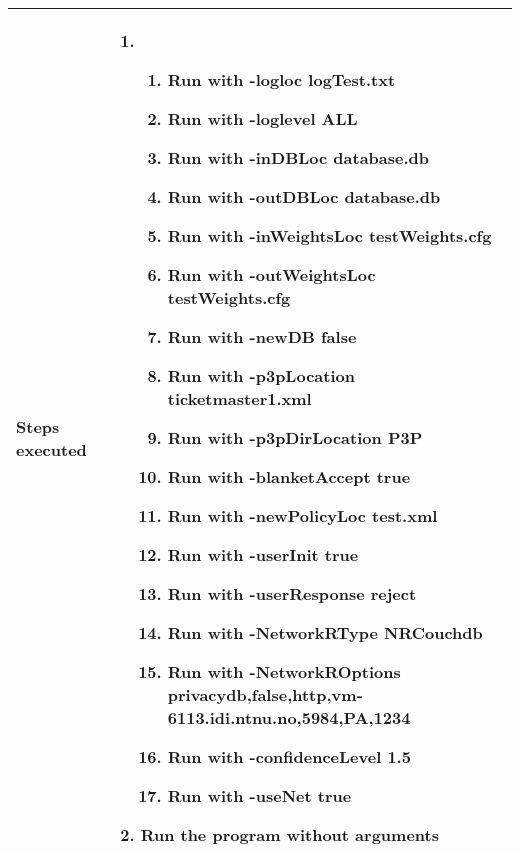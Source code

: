 \documentclass[a4paper]{article}
\begin{document}
\begin{center}
\begin{tabular}{ |  p{3cm} | p{7cm} | }
			Steps executed & 	\begin{enumerate}
							\item
							\begin{enumerate}
								\item Run with -logloc logTest.txt
								\item Run with -loglevel ALL
								\item Run with -inDBLoc database.db
								\item Run with -outDBLoc database.db
								\item Run with -inWeightsLoc testWeights.cfg
								\item Run with -outWeightsLoc testWeights.cfg
								\item Run with -newDB false
								\item Run with -p3pLocation ticketmaster1.xml
								\item Run with -p3pDirLocation P3P
								\item Run with -blanketAccept true
								\item Run with -newPolicyLoc test.xml
								\item Run with -userInit true
								\item Run with -userResponse reject
								\item Run with -NetworkRType NRCouchdb
								\item Run with -NetworkROptions privacydb,false,http,vm-6113.idi.ntnu.no,5984,PA,1234
								\item Run with -confidenceLevel 1.5
								\item Run with -useNet true
							\end{enumerate}
							\item Run the program without arguments
						\end{enumerate} \\ [5pt] \hline
			

\end{tabular}
\end{center}
\end{document}
